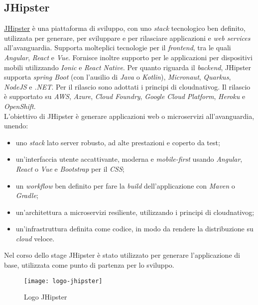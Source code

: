 \subsection{JHipster}
\label{jhi}
\href{https://www.jhipster.tech/}{JHipster} è una piattaforma di sviluppo, con uno \textit{stack} tecnologico ben definito, utilizzata per generare, per sviluppare e per rilasciare applicazioni e \textit{web services} all'avanguardia. Supporta molteplici tecnologie per il \textit{frontend}, tra le quali \textit{Angular}, \textit{React} e \textit{Vue}. Fornisce inoltre supporto per le applicazioni per dispositivi mobili utilizzando \textit{Ionic} e \textit{React Native}. Per quanto riguarda il \textit{backend}, JHipster supporta \textit{spring Boot} (con l'ausilio di \textit{Java} o \textit{Kotlin}), \textit{Micronaut}, \textit{Quarkus}, \textit{NodeJS} e \textit{.NET}. Per il rilascio sono adottati i principi di \gls{cloudnativog}\glsfirstoccur{}. Il rilascio è supportato su \textit{AWS}, \textit{Azure}, \textit{Cloud Foundry}, \textit{Google Cloud Platform}, \textit{Heroku} e \textit{OpenShift}.
\\L'obiettivo di JHipster è generare applicazioni web o microservizi all'avanguardia, unendo:
\begin{itemize}
    \item uno \textit{stack} lato server robusto, ad alte prestazioni e coperto da test;
    \item un'interfaccia utente accattivante, moderna e \textit{mobile-first} usando \textit{Angular}, \textit{React} o \textit{Vue} e \textit{Bootstrap} per il \textit{CSS};
    \item un \textit{workflow} ben definito per fare la \textit{build} dell'applicazione con \textit{Maven} o \textit{Gradle};
    \item un'architettura a microservizi resiliente,  utilizzando i principi di \gls{cloudnativog};
    \item un'infrastruttura definita come codice, in modo da rendere la distribuzione su \textit{cloud} veloce.
\end{itemize}
\newpage
Nel corso dello stage JHipster è stato utilizzato per generare l'applicazione di base, utilizzata come punto di partenza per lo sviluppo.
\begin{figure}[h]
    \begin{center}
    \texttt{[image: logo-jhipster]}
    \caption{Logo JHipster}
    \label{fig:figure2}
    \end{center}
\end{figure}

